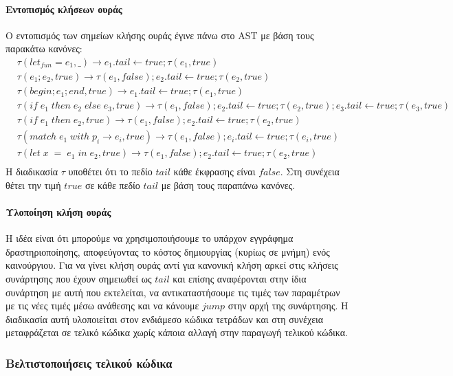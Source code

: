 \documentclass[12pt]{article}
\begin{document}
\paragraph{Εντοπισμός κλήσεων ουράς}
Ο εντοπισμός των σημείων κλήσης ουράς έγινε πάνω στο AST με βάση τους παρακάτω κανόνες:
\begin{align*}
  & \tau(let_{fun} = e_1, \_) \rightarrow e_1.tail \leftarrow true;\tau(e_1, true) \\[0.3em]
  & \tau(e_1;e_2, true) \rightarrow \tau(e_1, false); e_2.tail \leftarrow true ; \tau(e_2, true) \\[0.3em]
  & \tau(begin; e_1; end, true) \rightarrow e_1.tail \leftarrow true ; \tau(e_1, true) \\[0.3em]
  & \tau(if \; e_1 \; then \; e_2 \; else \; e_3, true) \rightarrow \tau(e_1, false); e_2.tail \leftarrow true ; \tau(e_2, true); e_3.tail \leftarrow true ; \tau(e_3, true) \\[0.3em]
  & \tau(if \; e_1 \; then \; e_2, true) \rightarrow \tau(e_1, false); e_2.tail \leftarrow true ; \tau(e_2, true) \\[0.3em]
  & \tau(match \; e_1 \; with \; p_i \rightarrow e_i, true) \rightarrow \tau(e_1, false); e_i.tail \leftarrow true ; \tau(e_i, true) \\[0.3em]
  & \tau(let \; x \;= \; e_1 \; in\; e_2, true) \rightarrow \tau(e_1, false); e_2.tail \leftarrow true ; \tau(e_2, true) \\[0.3em]
\end{align*}
Η διαδικασία $\tau$ υποθέτει ότι το πεδίο $tail$ κάθε έκφρασης είναι $false$. Στη συνέχεια θέτει την τιμή $true$ σε κάθε πεδίο $tail$ με βάση τους παραπάνω κανόνες.
\paragraph{Υλοποίηση κλήση ουράς}
Η ιδέα είναι ότι μπορούμε να χρησιμοποιήσουμε το υπάρχον εγγράφημα δραστηριοποίησης, αποφεύγοντας το κόστος δημιουργίας (κυρίως σε μνήμη) ενός καινούργιου.
Για να γίνει κλήση ουράς αντί για κανονική κλήση αρκεί στις κλήσεις συνάρτησης που έχουν σημειωθεί ως $tail$ και επίσης αναφέρονται στην ίδια συνάρτηση με αυτή που εκτελείται, να αντικαταστήσουμε τις τιμές των παραμέτρων με τις νέες τιμές μέσω ανάθεσης και να κάνουμε $jump$ στην αρχή της συνάρτησης. Η διαδικασία αυτή υλοποιείται στον ενδιάμεσο κώδικα τετράδων και στη συνέχεια μεταφράζεται σε τελικό κώδικα χωρίς κάποια αλλαγή στην παραγωγή τελικού κώδικα.
\subsubsection{Βελτιστοποιήσεις τελικού κώδικα}
\end{document}
